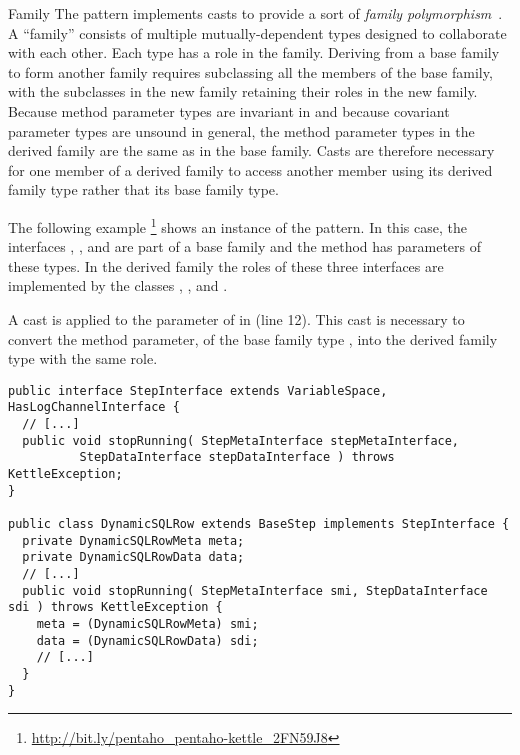 \begin{pattern}{Family}
  The \thisp{} pattern implements casts
  to provide a sort of
  \emph{family
polymorphism}~\citep{ernstFamilyPolymorphism2001}.
A ``family'' consists of
multiple mutually-dependent types designed to collaborate with each other.
Each type has a role in the family.
  Deriving from a base family to form another
  family requires subclassing all the members of the base family, with the
  subclasses in the new family retaining their roles in the new family.
  Because method parameter types are invariant in \java{} and because
  covariant parameter types are unsound in general, the
  method parameter types in the
  derived family are the same as in the base family.
  Casts are therefore necessary for one member of a derived family to access
  another member using its derived family type rather that its base family
  type.

\instances{}
The following example%
\footnote{\url{http://bit.ly/pentaho_pentaho-kettle_2FN59J8}}
shows an instance of the \thisp{} pattern.
%
  In this case, the interfaces , ,
  and  are part of a base family and the
   method has parameters of these types.
  In the derived family the roles of these three interfaces are
  implemented by the classes
  ,
  , and
  .

A cast is applied to the parameter  of  in
 (line 12). This cast is necessary to convert the
method parameter, of the base
family type , into the derived family type with the
same role.

\begin{verbatim}
public interface StepInterface extends VariableSpace, HasLogChannelInterface {
  // [...]
  public void stopRunning( StepMetaInterface stepMetaInterface,
          StepDataInterface stepDataInterface ) throws KettleException;
}

public class DynamicSQLRow extends BaseStep implements StepInterface {
  private DynamicSQLRowMeta meta;
  private DynamicSQLRowData data;
  // [...]
  public void stopRunning( StepMetaInterface smi, StepDataInterface sdi ) throws KettleException {
    meta = (DynamicSQLRowMeta) smi;
    data = (DynamicSQLRowData) sdi;
    // [...]
  }
}
\end{verbatim}


\end{pattern}
